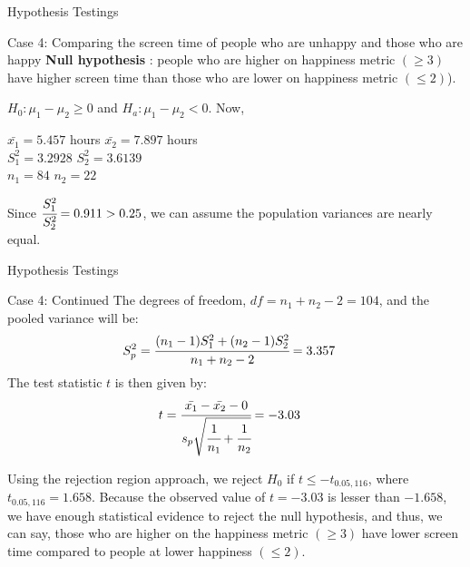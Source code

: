 \documentclass{beamer}
\begin{document}
\begin{frame}{Hypothesis Testings}
\begin{block} {Case 4:  Comparing the screen time of people who are unhappy and those
who are happy}
    \textbf{Null hypothesis} : people who are higher
on happiness metric $(\geq 3)$ have higher screen time than those who are lower on 
happiness metric $(\leq 2)$).

$ H_0 : \mu_1 - \mu_2 \geq 0$ and $H_a : \mu_1 - \mu_2 < 0$. Now, 
\par
\begin{center}
    $\bar{x_1} = 5.457$ hours \quad $\bar{x_2} = 7.897$ hours \\
    $S^2_1 = 3.2928$ \quad
    $S^2_2 = 3.6139$ \\
    $n_1 = 84$ \quad
    $n_2 = 22$
\end{center}

Since $\cfrac{S_1^2}{S_2^2} = 0.911>0.25$, we can assume the population variances are nearly equal.

\end{block}
\end{frame}

\begin{frame}{Hypothesis Testings}
\begin{block} {Case 4: Continued}
The degrees of freedom, $df = n_1 + n_2 -2 = 104$, and the pooled variance will be:
 \begin{align}
     S_p^2 &= \cfrac{(n_1-1)S_1^2 + (n_2-1)S_2^2}{n_1+n_2-2} = 3.357
 \end{align}
The test statistic $t$ is then given by:
 \begin{align}
      t &= \cfrac{\bar{x_1} - \bar{x_2} - 0}{s_p\sqrt{\cfrac{1}{n_1} + \cfrac{1}{n_2}}} = -3.03
 \end{align}
 \par
Using the rejection region approach, we reject $H_0$ if $t \leq -t_{0.05, 116}$, where $t_{0.05,116} = 1.658$.
Because the observed value of $t=-3.03$ is lesser than $-1.658$, we have enough statistical evidence to reject the null hypothesis, and thus, we can say, those who are higher on the happiness metric $(\geq 3)$  have lower screen time compared to people at lower happiness $(\leq 2)$.

\end{block}
\end{frame}
\end{document}
